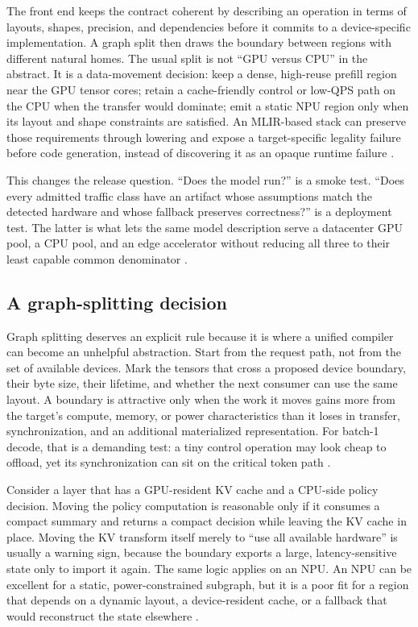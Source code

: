 The front end keeps the contract coherent by describing an operation in terms of layouts, shapes, precision, and dependencies before it commits to a device-specific implementation. A graph split then draws the boundary between regions with different natural homes. The usual split is not ``GPU versus CPU'' in the abstract. It is a data-movement decision: keep a dense, high-reuse prefill region near the GPU tensor cores; retain a cache-friendly control or low-QPS path on the CPU when the transfer would dominate; emit a static NPU region only when its layout and shape constraints are satisfied. An MLIR-based stack can preserve those requirements through lowering and expose a target-specific legality failure before code generation, instead of discovering it as an opaque runtime failure \citep{iree2024,lai2023relax,yirage2026}.

This changes the release question. ``Does the model run?'' is a smoke test. ``Does every admitted traffic class have an artifact whose assumptions match the detected hardware and whose fallback preserves correctness?'' is a deployment test. The latter is what lets the same model description serve a datacenter GPU pool, a CPU pool, and an edge accelerator without reducing all three to their least capable common denominator \citep{iree2024,rotem2018glow}.

\subsection{A graph-splitting decision}

Graph splitting deserves an explicit rule because it is where a unified compiler can become an unhelpful abstraction. Start from the request path, not from the set of available devices. Mark the tensors that cross a proposed device boundary, their byte size, their lifetime, and whether the next consumer can use the same layout. A boundary is attractive only when the work it moves gains more from the target's compute, memory, or power characteristics than it loses in transfer, synchronization, and an additional materialized representation. For batch-1 decode, that is a demanding test: a tiny control operation may look cheap to offload, yet its synchronization can sit on the critical token path \citep{memoryfloor2026,taxbreak2026}.

Consider a layer that has a GPU-resident KV cache and a CPU-side policy decision. Moving the policy computation is reasonable only if it consumes a compact summary and returns a compact decision while leaving the KV cache in place. Moving the KV transform itself merely to ``use all available hardware'' is usually a warning sign, because the boundary exports a large, latency-sensitive state only to import it again. The same logic applies on an NPU. An NPU can be excellent for a static, power-constrained subgraph, but it is a poor fit for a region that depends on a dynamic layout, a device-resident cache, or a fallback that would reconstruct the state elsewhere \citep{amd2024aie,rotem2018glow,memoryfloor2026}.

